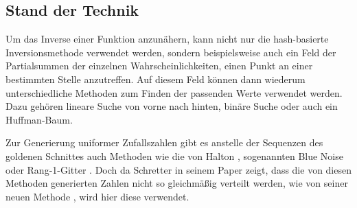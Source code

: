 \subsection{Stand der Technik}
Um das Inverse einer Funktion anzunähern, kann nicht nur die hash-basierte Inversionsmethode verwendet werden, sondern 
beispielsweise auch ein Feld der Partialsummen der einzelnen Wahrscheinlichkeiten, einen Punkt an einer bestimmten Stelle anzutreffen. 
Auf diesem Feld können dann wiederum unterschiedliche Methoden zum Finden der passenden Werte verwendet werden. Dazu gehören 
lineare Suche von vorne nach hinten, binäre Suche oder auch ein Huffman-Baum.

Zur Generierung uniformer Zufallszahlen gibt es anstelle der Sequenzen des goldenen Schnittes auch Methoden wie
die von Halton \cite{wong_luk_heng-halton_points_sampling-1997}, sogenannten Blue Noise \cite{yan-blue_noise_sampling-2015} 
oder Rang-1-Gitter \cite{prasad-rank1lattice-1973}. Doch da Schretter in seinem Paper zeigt, dass die von diesen Methoden generierten Zahlen 
nicht so gleichmäßig verteilt werden, wie von seiner neuen Methode \cite{schretter-golden_ratio_sequences-2012}, 
wird hier diese verwendet. 